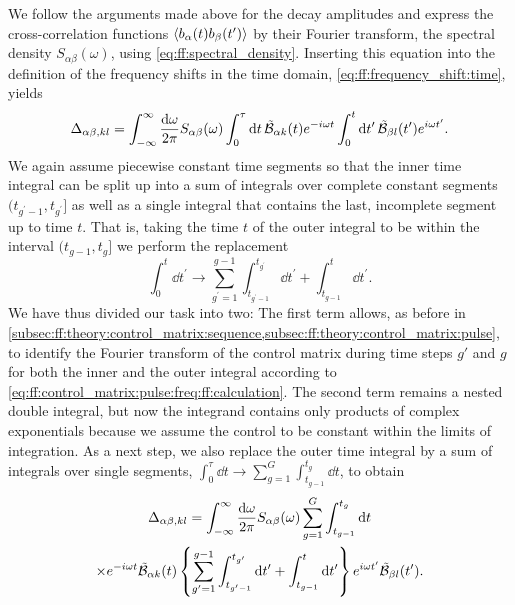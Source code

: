 We follow the arguments made above for the decay amplitudes and express the cross-correlation functions $\ev{b_\alpha(t) b_\beta(t^\prime)}$ by their Fourier transform, the spectral density $S_{\alpha\beta}(\omega)$, using \cref{eq:ff:spectral_density}.
Inserting this equation into the definition of the frequency shifts in the time domain, \cref{eq:ff:frequency_shift:time}, yields
\begin{equation}\label{eq:ff:frequency_shifts:time}
    \Delta_{\alpha\beta,kl} = \int_{-\infty}^\infty\frac{\dd{\omega}}{2\pi} S_{\alpha\beta}(\omega)
        \int_0^\tau\dd{t}\tilde{\mathcal{B}}_{\alpha k}(t)e^{-i\omega t}
        \int_0^t\dd{t^\prime}\tilde{\mathcal{B}}_{\beta l}(t^\prime)e^{i\omega t^\prime}.
\end{equation}
We again assume piecewise constant time segments so that the inner time integral can be split up into a sum of integrals over complete constant segments $(t_{g^\prime-1},t_{g^\prime}]$ as well as a single integral that contains the last, incomplete segment up to time $t$.
That is, taking the time $t$ of the outer integral to be within the interval $(t_{g-1}, t_g]$ we perform the replacement
\begin{equation}
    \int_0^t\dd{t^\prime} \rightarrow \sum_{g^\prime=1}^{g-1}\int_{t_{g^\prime-1}}^{t_{g^\prime}}\dd{t^\prime} + \int_{t_{g-1}}^{t}\dd{t^\prime}.
\end{equation}
We have thus divided our task into two: The first term allows, as before in \cref{subsec:ff:theory:control_matrix:sequence,subsec:ff:theory:control_matrix:pulse}, to identify the Fourier transform of the control matrix during time steps $g'$ and $g$ for both the inner and the outer integral according to \cref{eq:ff:control_matrix:pulse:freq:ff:calculation}.
The second term remains a nested double integral, but now the integrand contains only products of complex exponentials because we assume the control to be constant within the limits of integration.
As a next step, we also replace the outer time integral by a sum of integrals over single segments, $\int_0^\tau\dd{t}\rightarrow\sum_{g=1}^G\int_{t_{g-1}}^{t_g}\dd{t}$, to obtain
\begin{multline}\label{eq:ff:frequency_shifts:time:substituted}
    \Delta_{\alpha\beta,kl} = \int_{-\infty}^\infty\frac{\dd{\omega}}{2\pi} S_{\alpha\beta}(\omega)
        \sum_{g=1}^{G}\int_{t_{g-1}}^{t_{g}}\dd{t} \\
        \times e^{-i\omega t}\tilde{\mathcal{B}}_{\alpha k}(t)
        \left\lbrace\sum_{g^\prime=1}^{g-1}\int_{t_{g^\prime-1}}^{t_{g^\prime}}\dd{t^\prime} + \int_{t_{g-1}}^{t}\dd{t^\prime}\right\rbrace
        e^{i\omega t^\prime}\tilde{\mathcal{B}}_{\beta l}(t').
\end{multline}
